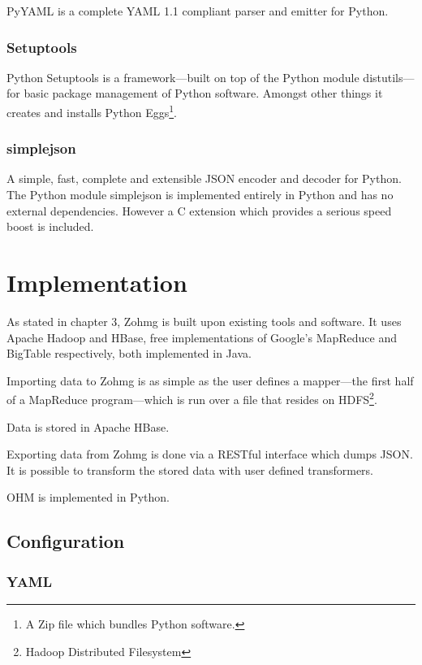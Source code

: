 \documentclass[a4paper,10pt]{book}
\begin{document}
PyYAML is a complete YAML 1.1 compliant parser and emitter for Python.


\subsection{Setuptools}

Python Setuptools is a framework---built on top of the Python module
distutils---for basic package management of Python software. Amongst other
things it creates and installs Python Eggs\footnote{A Zip file which
bundles Python software.}.


\subsection{simplejson}

A simple, fast, complete and extensible JSON encoder and decoder for
Python. The Python module simplejson is implemented entirely in Python and
has no external dependencies. However a C extension which provides a
serious speed boost is included.



\chapter{Implementation}

As stated in chapter 3, Zohmg is built upon existing tools and software. It
uses Apache Hadoop and HBase, free implementations of Google's MapReduce
and BigTable respectively, both implemented in Java.

Importing data to Zohmg is as simple as the user defines a mapper---the
first half of a MapReduce program---which is run over a file that resides
on HDFS\footnote{Hadoop Distributed Filesystem}.

Data is stored in Apache HBase.

Exporting data from Zohmg is done via a RESTful interface which dumps JSON.
It is possible to transform the stored data with user defined transformers.

OHM is implemented in Python.



\section{Configuration}

\subsection{YAML}
\end{document}
